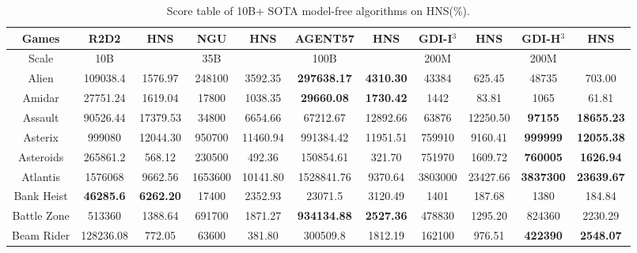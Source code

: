 \documentclass[nohyperref]{article}
\theoremstyle{plain}
\begin{document}
\begin{table}[!hb]
\footnotesize
\begin{center}
\caption{Score table of 10B+ SOTA  model-free algorithms on HNS(\%).}
\label{Tab:Score table of SOTA  model-free algorithms on HNS.}
\setlength{\tabcolsep}{1.0pt}
\begin{tabular}{| c| c c| c c| c c| c c| c c|}
\hline
 Games & R2D2 & HNS & NGU & HNS & AGENT57 & HNS & GDI-I$^3$ & HNS & GDI-H$^3$ & HNS \\
\hline
Scale  & 10B   &        & 35B &         & 100B     &        & 200M &     &  200M   &\\
\hline
 Alien  & 109038.4 & 1576.97 & 248100 & 3592.35 & \textbf{297638.17} & \textbf{4310.30}             &43384             &625.45                &48735             &703.00       \\
 Amidar & 27751.24 & 1619.04 & 17800  & 1038.35 & \textbf{29660.08}  & \textbf{1730.42}             &1442              &83.81                 &1065              &61.81        \\
 Assault &  90526.44 & 17379.53 & 34800 & 6654.66 & 67212.67 & 12892.66            &63876           &12250.50          &\textbf{97155}        &\textbf{18655.23}     \\
 Asterix &  999080   & 12044.30 & 950700 & 11460.94 & 991384.42 & 11951.51         &759910          &9160.41           &\textbf{999999}       &\textbf{12055.38}     \\
 Asteroids & 265861.2 & 568.12 & 230500 & 492.36   & 150854.61 & 321.70                             &751970            &1609.72               &\textbf{760005}            &\textbf{1626.94}      \\
 Atlantis & 1576068   & 9662.56 & 1653600 & 10141.80 & 1528841.76 & 9370.64                         &3803000           &23427.66              &\textbf{3837300}           &\textbf{23639.67}     \\
 Bank Heist & \textbf{46285.6} & \textbf{6262.20} & 17400   & 2352.93  & 23071.5& 3120.49           &1401              &187.68                &1380              &184.84       \\
 Battle Zone & 513360 & 1388.64 & 691700  & 1871.27  & \textbf{934134.88}& \textbf{2527.36}         &478830            &1295.20               &824360            &2230.29      \\
 Beam Rider & 128236.08 & 772.05 & 63600  & 381.80   & 300509.8 & 1812.19         &162100            &976.51                &\textbf{422390}            &\textbf{2548.07}      \\

\end{tabular}
\end{center}
\end{table}
\end{document}
